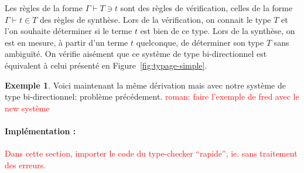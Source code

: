 \documentclass {article}
\theoremstyle{definition}
\newtheorem{example}{Exemple}
\theoremstyle{remark}
\newcommand{\todo}[1]{\textcolor{red}{#1}}
\begin{document}
Les règles de la forme \(\Gamma\vdash T \ni t\) sont des règles de
vérification, celles de la forme \(\Gamma\vdash t \in T\) des règles
de synthèse.  Lors de la vérification, on connait le type $T$ et
l'on souhaite déterminer si le terme $t$ est bien de ce
type. Lors de la synthèse, on est en mesure, à partir d'un terme
$t$ quelconque, de déterminer son type \(T\) sans ambiguïté.  On vérifie
aisément que ce système de type bi-directionnel est équivalent à celui
présenté en Figure~\ref{fig:typage-simple}.

\begin{example}
  Voici maintenant la même dérivation mais avec notre système de type bi-directionnel:
  problème précédement.
  \todo{roman: faire l'exemple de fred avec le new système}
\end{example}

\paragraph{Implémentation :}

\todo{Dans cette section, importer le code du type-checker ``rapide'', ie. sans traitement des erreurs.}
\end{document}
